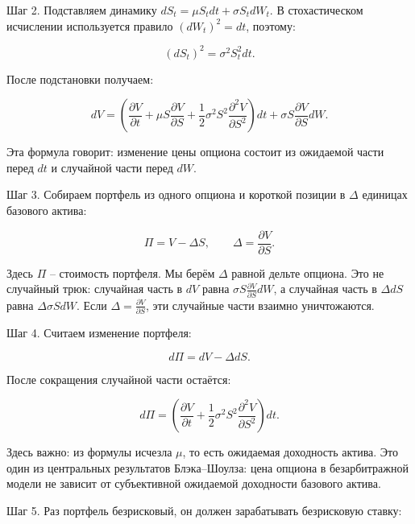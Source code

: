 \documentclass[11pt,a4paper]{article}
\begin{document}
Шаг 2. Подставляем динамику $dS_t=\mu S_tdt+\sigma S_tdW_t$. В стохастическом исчислении используется правило $(dW_t)^2=dt$, поэтому:

\begin{equation}
(dS_t)^2 = \sigma^2S_t^2dt.
\end{equation}

После подстановки получаем:

\begin{equation}
dV =
\left(
\frac{\partial V}{\partial t}
+\mu S\frac{\partial V}{\partial S}
+\frac{1}{2}\sigma^2S^2
\frac{\partial^2V}{\partial S^2}
\right)dt
+
\sigma S\frac{\partial V}{\partial S}dW.
\end{equation}

Эта формула говорит: изменение цены опциона состоит из ожидаемой части перед $dt$ и случайной части перед $dW$.

Шаг 3. Собираем портфель из одного опциона и короткой позиции в $\Delta$ единицах базового актива:

\begin{equation}
\Pi = V - \Delta S,
\qquad
\Delta = \frac{\partial V}{\partial S}.
\end{equation}

Здесь $\Pi$ -- стоимость портфеля. Мы берём $\Delta$ равной дельте опциона. Это не случайный трюк: случайная часть в $dV$ равна $\sigma S \frac{\partial V}{\partial S}dW$, а случайная часть в $\Delta dS$ равна $\Delta\sigma SdW$. Если $\Delta=\frac{\partial V}{\partial S}$, эти случайные части взаимно уничтожаются.

Шаг 4. Считаем изменение портфеля:

\begin{equation}
d\Pi=dV-\Delta dS.
\end{equation}

После сокращения случайной части остаётся:

\begin{equation}
d\Pi =
\left(
\frac{\partial V}{\partial t}
+\frac{1}{2}\sigma^2S^2
\frac{\partial^2V}{\partial S^2}
\right)dt.
\end{equation}

Здесь важно: из формулы исчезла $\mu$, то есть ожидаемая доходность актива. Это один из центральных результатов Блэка--Шоулза: цена опциона в безарбитражной модели не зависит от субъективной ожидаемой доходности базового актива.

Шаг 5. Раз портфель безрисковый, он должен зарабатывать безрисковую ставку:
\end{document}

